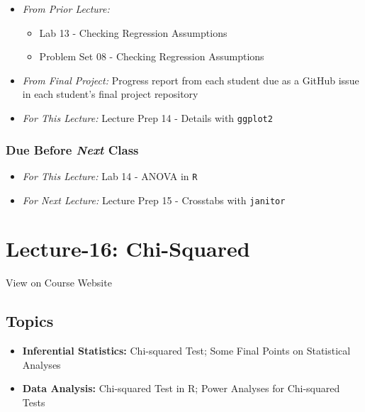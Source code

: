 \documentclass[]{book}
\providecommand{\tightlist}{%
  \setlength{\itemsep}{0pt}\setlength{\parskip}{0pt}}
\theoremstyle{definition}
\theoremstyle{definition}
\theoremstyle{definition}
\theoremstyle{remark}
\begin{document}
\begin{itemize}
\tightlist
\item
  \emph{From Prior Lecture:}

  \begin{itemize}
  \tightlist
  \item
    Lab 13 - Checking Regression Assumptions
  \item
    Problem Set 08 - Checking Regression Assumptions
  \end{itemize}
\item
  \emph{From Final Project:} Progress report from each student due as a
  GitHub issue in each student's final project repository
\item
  \emph{For This Lecture:} Lecture Prep 14 - Details with
  \texttt{ggplot2}
\end{itemize}

\hypertarget{due-before-next-class-14}{%
\subsubsection*{\texorpdfstring{Due Before \emph{Next}
Class}{Due Before Next Class}}\label{due-before-next-class-14}}

\begin{itemize}
\tightlist
\item
  \emph{For This Lecture:} Lab 14 - ANOVA in \texttt{R}
\item
  \emph{For Next Lecture:} Lecture Prep 15 - Crosstabs with
  \texttt{janitor}
\end{itemize}

\hypertarget{lecture-16-chi-squared}{%
\section*{Lecture-16: Chi-Squared}\label{lecture-16-chi-squared}}

View on Course Website

\hypertarget{topics-16}{%
\subsection*{Topics}\label{topics-16}}

\begin{itemize}
\tightlist
\item
  \textbf{Inferential Statistics:} Chi-squared Test; Some Final Points
  on Statistical Analyses
\item
  \textbf{Data Analysis:} Chi-squared Test in R; Power Analyses for
  Chi-squared Tests
\end{itemize}
\end{document}
